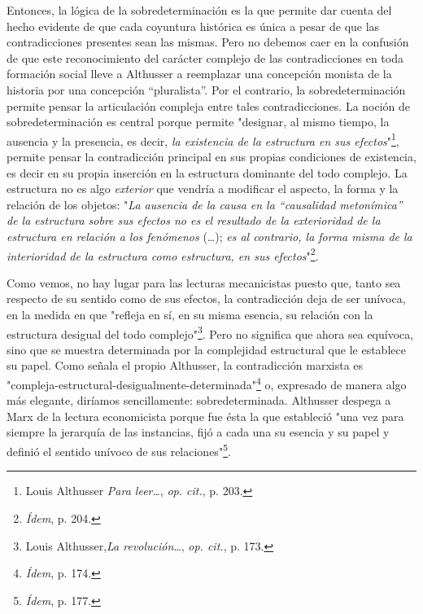 \documentclass{book}
\begin{document}
Entonces, la lógica de la sobredeterminación es la que permite dar
cuenta del hecho evidente de que cada coyuntura histórica es única a
pesar de que las contradicciones presentes sean las mismas. Pero no
debemos caer en la confusión de que este reconocimiento del carácter
complejo de las contradicciones en toda formación social lleve a
Althusser a reemplazar una concepción monista de la historia por una
concepción ``pluralista''. Por el contrario, la sobredeterminación
permite pensar la articulación compleja entre tales contradicciones. La
noción de sobredeterminación es central porque permite "designar, al
mismo tiempo, la ausencia y la presencia, es decir, \emph{la existencia
de la estructura en sus efectos}"\footnote{Louis Althusser \emph{Para
  leer}\ldots, \emph{op. cit.}, p. 203.}, permite pensar la
contradicción principal en sus propias condiciones de existencia, es
decir en su propia inserción en la estructura dominante del todo
complejo. La estructura no es algo \emph{exterior} que vendría a
modificar el aspecto, la forma y la relación de los objetos: "\emph{La
ausencia de la causa en la ``causalidad metonímica'' de la estructura
sobre sus efectos no es el resultado de la exterioridad de la estructura
en relación a los fenómenos} (\dots); \emph{es al contrario, la
forma misma de la interioridad de la estructura como estructura, en sus
efectos}"\footnote{\emph{Ídem}, p. 204.}.

Como vemos, no hay lugar para las lecturas mecanicistas puesto que,
tanto sea respecto de su sentido como de sus efectos, la contradicción
deja de ser unívoca, en la medida en que "refleja en sí, en su misma
esencia, su relación con la estructura desigual del todo
complejo"\footnote{Louis Althusser,\emph{La revolución}\ldots, \emph{op.
  cit.}, p. 173.}. Pero no significa que ahora sea equívoca, sino que se
muestra determinada por la complejidad estructural que le establece su
papel. Como señala el propio Althusser, la contradicción marxista es
"compleja-estructural-desigualmente-determinada"\footnote{\emph{Ídem},
  p. 174.} o, expresado de manera algo más elegante, diríamos
sencillamente: sobredeterminada. Althusser despega a Marx de la lectura
economicista porque fue ésta la que estableció "una vez para siempre la
jerarquía de las instancias, fijó a cada una su esencia y su papel y
definió el sentido unívoco de sus relaciones"\footnote{\emph{Ídem}, p.
  177.}.
\end{document}
